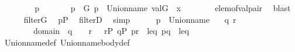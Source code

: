 \begin{isabellebody}
\ \ \ \ \isamarkupfalse%
\ \isamarkupfalse%
\ {\isasymtheta}\ p\ \isanewline
\ \ \ \ \ \ {\isachardoublequoteopen}p\ {\isasymin}\ G{\isachardoublequoteclose}\ {\isachardoublequoteopen}{\isasymlangle}{\isasymtheta}{\isacharcomma}{\kern0pt}p{\isasymrangle}\ {\isasymin}\ Union{\isacharunderscore}{\kern0pt}name{\isacharparenleft}{\kern0pt}{\isasymtau}{\isacharparenright}{\kern0pt}{\isachardoublequoteclose}\ {\isachardoublequoteopen}val{\isacharparenleft}{\kern0pt}G{\isacharcomma}{\kern0pt}{\isasymtheta}{\isacharparenright}{\kern0pt}\ {\isacharequal}{\kern0pt}\ x{\isachardoublequoteclose}\isanewline
\ \ \ \ \ \ \isamarkupfalse%
\ elem{\isacharunderscore}{\kern0pt}of{\isacharunderscore}{\kern0pt}val{\isacharunderscore}{\kern0pt}pair\ \isamarkupfalse%
\ blast\isanewline
\ \ \ \ \isamarkupfalse%
\ {\isacartoucheopen}filter{\isacharparenleft}{\kern0pt}G{\isacharparenright}{\kern0pt}{\isacartoucheclose}\ \isamarkupfalse%
\ {\isachardoublequoteopen}p{\isasymin}P{\isachardoublequoteclose}\ \isamarkupfalse%
\ filterD\ \isamarkupfalse%
\ simp\isanewline
\ \ \ \ \isamarkupfalse%
\ {\isacartoucheopen}{\isasymlangle}{\isasymtheta}{\isacharcomma}{\kern0pt}p{\isasymrangle}\ {\isasymin}\ Union{\isacharunderscore}{\kern0pt}name{\isacharparenleft}{\kern0pt}{\isasymtau}{\isacharparenright}{\kern0pt}{\isacartoucheclose}\ \isamarkupfalse%
\ {\isasymsigma}\ q\ r\ \isanewline
\ \ \ \ \ \ {\isachardoublequoteopen}{\isasymsigma}\ {\isasymin}\ domain{\isacharparenleft}{\kern0pt}{\isasymtau}{\isacharparenright}{\kern0pt}{\isachardoublequoteclose}\ \ {\isachardoublequoteopen}{\isasymlangle}{\isasymsigma}{\isacharcomma}{\kern0pt}q{\isasymrangle}\ {\isasymin}\ {\isasymtau}\ {\isachardoublequoteclose}\ {\isachardoublequoteopen}{\isasymlangle}{\isasymtheta}{\isacharcomma}{\kern0pt}r{\isasymrangle}\ {\isasymin}\ {\isasymsigma}{\isachardoublequoteclose}\ {\isachardoublequoteopen}r{\isasymin}P{\isachardoublequoteclose}\ {\isachardoublequoteopen}q{\isasymin}P{\isachardoublequoteclose}\ {\isachardoublequoteopen}{\isasymlangle}p{\isacharcomma}{\kern0pt}r{\isasymrangle}\ {\isasymin}\ leq{\isachardoublequoteclose}\ {\isachardoublequoteopen}{\isasymlangle}p{\isacharcomma}{\kern0pt}q{\isasymrangle}\ {\isasymin}\ leq{\isachardoublequoteclose}\isanewline
\ \ \ \ \ \ \isamarkupfalse%
\ Union{\isacharunderscore}{\kern0pt}name{\isacharunderscore}{\kern0pt}def\ Union{\isacharunderscore}{\kern0pt}name{\isacharunderscore}{\kern0pt}body{\isacharunderscore}{\kern0pt}def\ \isamarkupfalse%

\end{isabellebody}
